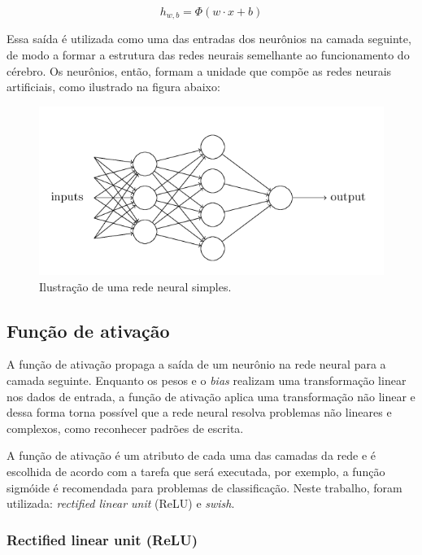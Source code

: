 \begin{equation}
  h_{w,b} = \Phi(w \cdot x + b)
\end{equation}

Essa saída é utilizada como uma das entradas dos neurônios
na camada seguinte, de modo a formar a estrutura das redes 
neurais semelhante ao funcionamento do cérebro. Os neurônios,
então, formam a unidade que compõe as redes neurais artificiais,
como ilustrado na figura abaixo:

\begin{figure}[H] 
  \includegraphics[width= 12cm]{../figuras/rede-neural.png}
  \caption{Ilustração de uma rede neural simples.\cite{deeplearningbook}}
  \label{fig:redeneural}
\end{figure}


\subsection{Função de ativação}

A função de ativação propaga a saída de um 
neurônio na rede neural para a camada seguinte. Enquanto os pesos 
e o \textit{bias} realizam uma transformação linear nos dados 
de entrada, a função de ativação aplica uma transformação não
linear e dessa forma torna possível que a rede neural resolva
problemas não lineares e complexos, como reconhecer padrões de 
escrita.\cite{deeplearningbook}

A função de ativação é um atributo de cada uma das camadas 
da rede e é escolhida de acordo com a tarefa que será 
executada, por exemplo, a função sigmóide é recomendada
 para problemas de classificação. Neste trabalho, 
foram utilizada: \textit{rectified linear unit} (ReLU) e \textit{swish}.

\subsubsection{Rectified linear unit (ReLU)}

